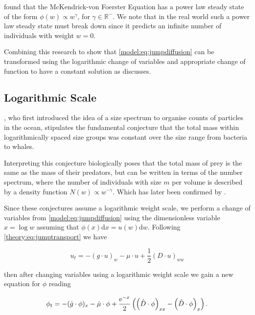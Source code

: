 \documentclass[../main]{subfiles}
\begin{document}
  \cite{benoit2004} found that the McKendrick-von Foerster Equation has a power law steady state of the form $\phi(w) \propto w^{\gamma}$, for $\gamma \in \mathbb{R}^-$. We note that in the real world such a power law steady state must break down since it predicts an infinite number of individuals with weight $w = 0$.

  Combining this research to show that \autoref{model:eq:jumpdiffusion} can be transformed using the logarithmic change of variables and appropriate change of function to have a constant solution as \cite{benoit2004} discusses.

  \subsection{Logarithmic Scale}
  \cite{sheldon1967}, who first introduced the idea of a size spectrum to organise counts of particles in the ocean, stipulates the fundamental conjecture that the total mass within logarithmically spaced size groups was constant over the size range from bacteria to whales.

  Interpreting this conjecture biologically \cite{silvert1980} poses that the total mass of prey is the same as the mass of their predators, but can be written in terms of the number spectrum, where the number of individuals with size $m$ per volume is described by a density function $N(w) \propto w^{-\gamma}$. Which has later been confirmed by \cite{benoit2004}.

  Since these conjectures assume a logarithmic weight scale, we perform a change of variables from \autoref{model:eq:jumpdiffusion} using the dimensionless variable $x = \log{w}$ assuming that $\phi(x) \mathrm{d}x = u(w) \mathrm{d}w$. Following \autoref{theory:eq:jumptransport} we have

  \begin{equation}
    u_t = - (g \cdot u)_w - \mu \cdot u + \frac{1}{2} (D \cdot u)_{ww}
  \end{equation}

  then after changing variables using a logarithmic weight scale we gain a new equation for $\phi$ reading

  \begin{equation} \label{model:eq:logscale}
    \phi_t = - (\hat{g} \cdot \phi)_x - \hat{\mu} \cdot \phi + \frac{\operatorname{e}^{-x}}{2} \left( \left( \hat{D} \cdot \phi \right)_{xx} - \left( \hat{D} \cdot \phi \right)_x \right).
  \end{equation}
\end{document}
